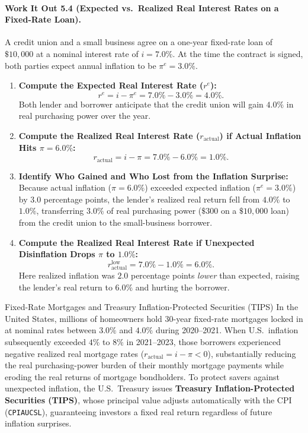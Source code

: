 \documentclass[11pt,letterpaper]{article}
\begin{document}
\paragraph{Work It Out 5.4 (Expected vs.\ Realized Real Interest Rates on a Fixed-Rate Loan).}
A credit union and a small business agree on a one-year fixed-rate loan of $\$10{,}000$ at a nominal interest rate of $i = 7.0\%$. At the time the contract is signed, both parties expect annual inflation to be $\pi^e = 3.0\%$.
\begin{enumerate}
    \item \textbf{Compute the Expected Real Interest Rate ($r^e$):}
    $$r^e = i - \pi^e = 7.0\% - 3.0\% = 4.0\%.$$
    Both lender and borrower anticipate that the credit union will gain $4.0\%$ in real purchasing power over the year.
    \item \textbf{Compute the Realized Real Interest Rate ($r_{\text{actual}}$) if Actual Inflation Hits $\pi = 6.0\%$:}
    $$r_{\text{actual}} = i - \pi = 7.0\% - 6.0\% = 1.0\%.$$
    \item \textbf{Identify Who Gained and Who Lost from the Inflation Surprise:}
    Because actual inflation ($\pi = 6.0\%$) exceeded expected inflation ($\pi^e = 3.0\%$) by $3.0$ percentage points, the lender's realized real return fell from $4.0\%$ to $1.0\%$, transferring $3.0\%$ of real purchasing power ($\$300$ on a $\$10{,}000$ loan) from the credit union to the small-business borrower.
    \item \textbf{Compute the Realized Real Interest Rate if Unexpected Disinflation Drops $\pi$ to $1.0\%$:}
    $$r_{\text{actual}}^{\text{low}} = 7.0\% - 1.0\% = 6.0\%.$$
    Here realized inflation was $2.0$ percentage points \emph{lower} than expected, raising the lender's real return to $6.0\%$ and hurting the borrower.
\end{enumerate}

\begin{examplecase}{Fixed-Rate Mortgages and Treasury Inflation-Protected Securities (TIPS)}
In the United States, millions of homeowners hold $30$-year fixed-rate mortgages locked in at nominal rates between $3.0\%$ and $4.0\%$ during 2020--2021. When U.S.\ inflation subsequently exceeded $4\%$ to $8\%$ in 2021--2023, those borrowers experienced negative realized real mortgage rates ($r_{\text{actual}} = i - \pi < 0$), substantially reducing the real purchasing-power burden of their monthly mortgage payments while eroding the real returns of mortgage bondholders. To protect savers against unexpected inflation, the U.S.\ Treasury issues \textbf{Treasury Inflation-Protected Securities (TIPS)}, whose principal value adjusts automatically with the CPI (\texttt{CPIAUCSL}), guaranteeing investors a fixed real return regardless of future inflation surprises.
\end{examplecase}
\end{document}
